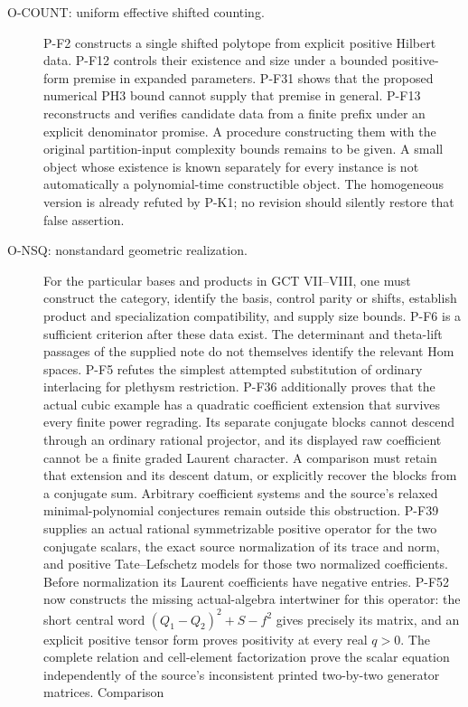\begin{description}
\item[O-COUNT: uniform effective shifted counting.]
P-F2 constructs a single shifted polytope from explicit positive Hilbert
data. P-F12 controls their existence and size under a bounded
positive-form premise in expanded parameters. P-F31 shows that the
proposed numerical PH3 bound cannot supply that premise in general. P-F13 reconstructs
and verifies candidate data from a finite prefix under an explicit
denominator promise. A procedure constructing them with the original
partition-input complexity bounds remains to be given. A small object
whose existence is known separately for every instance is not automatically
a polynomial-time constructible object. The homogeneous version is already
refuted by P-K1; no revision should silently restore that false assertion.

\item[O-NSQ: nonstandard geometric realization.]
For the particular bases and products in GCT VII--VIII, one must construct
the category, identify the basis, control parity or shifts, establish
product and specialization compatibility, and supply size bounds.
P-F6 is a sufficient criterion after these data exist. The determinant
and theta-lift passages of the supplied note do not themselves identify
the relevant Hom spaces. P-F5 refutes the simplest attempted substitution
of ordinary interlacing for plethysm restriction.
P-F36 additionally proves that the actual cubic example has a
quadratic coefficient extension that survives every finite power
regrading. Its separate conjugate blocks cannot descend through
an ordinary rational projector, and its displayed raw coefficient
cannot be a finite graded Laurent character. A comparison must
retain that extension and its descent datum, or explicitly recover
the blocks from a conjugate sum. Arbitrary coefficient systems
and the source's relaxed minimal-polynomial conjectures remain
outside this obstruction.
P-F39 supplies an actual rational symmetrizable positive operator
for the two conjugate scalars, the exact source normalization of
its trace and norm, and positive Tate--Lefschetz models for those
two normalized coefficients. Before normalization its Laurent
coefficients have negative entries. P-F52 now constructs the
missing actual-algebra intertwiner for this operator: the short
central word $(Q_1-Q_2)^2+S-f^2$ gives precisely its matrix,
and an explicit positive tensor form proves positivity at every
real $q>0$. The complete relation and cell-element factorization
prove the scalar equation independently of the source's
inconsistent printed two-by-two generator matrices. Comparison

\end{description}

